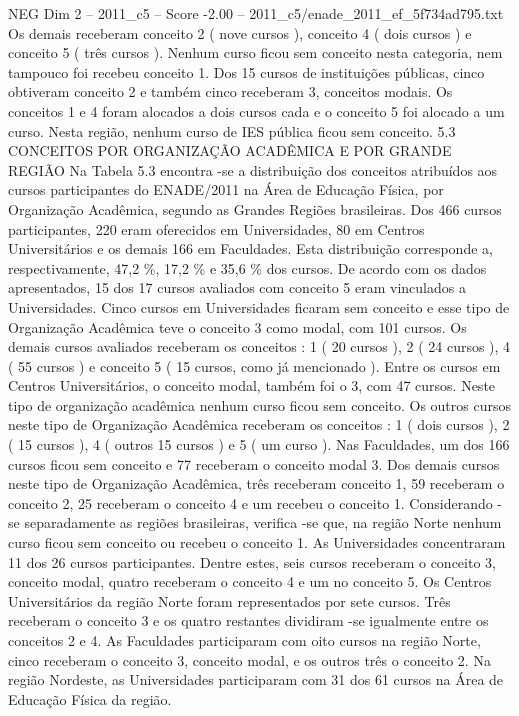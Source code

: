 \begin{textsample}{NEG Dim 2 – 2011\_c5 – Score -2.00 – 2011\_c5/enade\_2011\_ef\_5f734ad795.txt}
Os demais receberam conceito 2 ( nove cursos ), conceito 4 ( dois cursos ) e conceito 5 ( três cursos ).
Nenhum curso ficou sem conceito nesta categoria, nem tampouco foi recebeu conceito 1.
Dos 15 cursos de instituições públicas, cinco obtiveram conceito 2 e também cinco receberam 3, conceitos modais.
Os conceitos 1 e 4 foram alocados a dois cursos cada e o conceito 5 foi alocado a um curso.
Nesta região, nenhum curso de IES pública ficou sem conceito. 5.3 CONCEITOS POR ORGANIZAÇÃO ACADÊMICA E POR GRANDE REGIÃO Na Tabela 5.3 encontra -se a distribuição dos conceitos atribuídos aos cursos participantes do ENADE/2011 na Área de Educação Física, por Organização Acadêmica, segundo as Grandes Regiões brasileiras.
Dos 466 cursos participantes, 220 eram oferecidos em Universidades, 80 em Centros Universitários e os demais 166 em Faculdades.
Esta distribuição corresponde a, respectivamente, 47,2 \%, 17,2 \% e 35,6 \% dos cursos.
De acordo com os dados apresentados, 15 dos 17 cursos avaliados com conceito 5 eram vinculados a Universidades.
Cinco cursos em Universidades ficaram sem conceito e esse tipo de Organização Acadêmica teve o conceito 3 como modal, com 101 cursos.
Os demais cursos avaliados receberam os conceitos : 1 ( 20 cursos ), 2 ( 24 cursos ), 4 ( 55 cursos ) e conceito 5 ( 15 cursos, como já mencionado ).
Entre os cursos em Centros Universitários, o conceito modal, também foi o 3, com 47 cursos.
Neste tipo de organização acadêmica nenhum curso ficou sem conceito.
Os outros cursos neste tipo de Organização Acadêmica receberam os conceitos : 1 ( dois cursos ), 2 ( 15 cursos ), 4 ( outros 15 cursos ) e 5 ( um curso ).
Nas Faculdades, um dos 166 cursos ficou sem conceito e 77 receberam o conceito modal 3.
Dos demais cursos neste tipo de Organização Acadêmica, três receberam conceito 1, 59 receberam o conceito 2, 25 receberam o conceito 4 e um recebeu o conceito 1.
Considerando -se separadamente as regiões brasileiras, verifica -se que, na região Norte nenhum curso ficou sem conceito ou recebeu o conceito 1.
As Universidades concentraram 11 dos 26 cursos participantes.
Dentre estes, seis cursos receberam o conceito 3, conceito modal, quatro receberam o conceito 4 e um no conceito 5.
Os Centros Universitários da região Norte foram representados por sete cursos.
Três receberam o conceito 3 e os quatro restantes dividiram -se igualmente entre os conceitos 2 e 4.
As Faculdades participaram com oito cursos na região Norte, cinco receberam o conceito 3, conceito modal, e os outros três o conceito 2.
Na região Nordeste, as Universidades participaram com 31 dos 61 cursos na Área de Educação Física da região.

\end{textsample}
